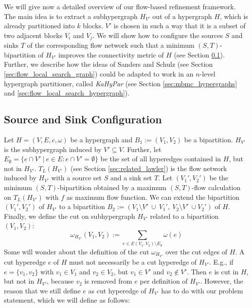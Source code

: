 We will give now a detailed overview of our flow-based refinement framework. The main
idea is to extract a subhypergraph $H_{V'}$ out of a hypergraph $H$, which is already
partitioned into $k$ blocks. $V'$ is chosen in such a way that it is a subset of two
adjacent blocks $V_i$ and $V_j$. We will show how to configure
the sources $S$ and sinks $T$ of the corresponding flow network such that
a minimum $(S,T)$-bipartition of $H_{V'}$ improves the connectivity metric of $H$
(see Section \ref{sec:source_and_sink}). Further, we describe how the ideas of
Sanders and Schulz \cite{sanders2011engineering} (see Section \ref{sec:flow_local_search_graph}) 
could be adapted to work in an $n$-level hypergraph partitioner, called \emph{KaHyPar}
(see Section \ref{sec:mbmc_hypergraphs} and \ref{sec:flow_local_search_hypergraph}). 

\subsection{Source and Sink Configuration}
\label{sec:source_and_sink}

Let $H = (V,E,c,\omega)$ be a hypergraph and $B_1 := (V_1, V_2)$ be a bipartition.
$H_{V'}$ is the subhypergraph induced by $V' \subseteq V$. 
Further, let $E_{\emptyset} = \{ e \cap V'\ |\ e \in E: e \cap V' = \emptyset\} $
be the set of all hyperedges contained in $H$, but not in $H_{V'}$. $T_L(H_{V'})$ 
(see Section \ref{sec:related_lawler}) is the flow network induced by $H_{V'}$ with a
source set $S$ and a sink set $T$. Let $(V_1',V_2')$ be the minimum $(S,T)$-bipartition
obtained by a maximum $(S,T)$-flow calculation on $T_L(H_{V'})$ with $f$ as maximum flow
function. We can extend the bipartition $(V_1',V_2')$ of $H_{V'}$ to a bipartition 
$B_2 := (V_1 \setminus V'\ \cup\ V_1',\ V_2 \setminus V'\ \cup V_2' )$ of $H$. Finally,
we define the cut on subhypergraph $H_{V'}$ related to a
bipartition $(V_1,V_2)$:
\[\omega_{H_{V'}}(V_1,V_2) := \sum_{e \in E(V_1,V_2) \setminus E_{\emptyset}} \omega(e) \]
Some will wonder about the definition of the cut $\omega_{H_{V'}}$ over the
cut edges of $H$. A cut hyperedge $e$ of $H$ must not necessarily be a cut hyperedge
of $H_{V'}$. E.g., if $e = \{v_1,v_2\}$ with $v_1 \in V_1$ and $v_2 \in V_2$, but
$v_1 \in V'$ and $v_2 \notin V'$. Then $e$ is cut in $H$, but not in $H_{V'}$, because
$v_2$ is removed from $e$ per definition of $H_{V'}$. However, the reason that we still
define $e$ as cut hyperedge of $H_{V'}$ has to do with our problem statement, 
which we will define as follows:

